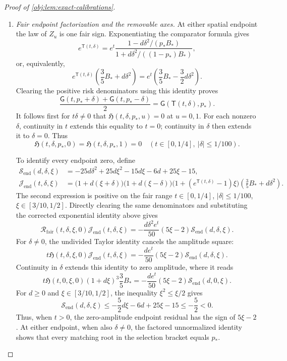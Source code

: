 \documentclass[11pt]{article}
\begin{document}
\begin{proof}[Proof of \cref{obj:lem:exact-calibrations}]
\begin{enumerate}
\item \emph{Fair endpoint factorization and the removable axes.}
At either spatial endpoint the law of \(Z_u\) is one fair sign. Exponentiating the comparator formula gives
\[
e^{\mathsf T(t,\delta)}
=e^t
\frac{1-d\delta^2/(p_*B_*)}
     {1+d\delta^2/((1-p_*)B_*)},
\]
or, equivalently,
\[
e^{\mathsf T(t,\delta)}
\left(\frac35B_*+d\delta^2\right)
=
e^t\left(\frac35B_*-\frac32d\delta^2\right).
\]
Clearing the positive risk denominators using this identity proves
\[
\frac{\mathsf G(t,p_*+\delta)+\mathsf G(t,p_*-\delta)}2
=\mathsf G(\mathsf T(t,\delta),p_*).
\]
It follows first for \(t\delta\ne0\) that
\(\mathfrak H(t,\delta,p_*,u)=0\) at \(u=0,1\).
For each nonzero \(\delta\), continuity in \(t\) extends this equality to \(t=0\); continuity in \(\delta\) then extends it to \(\delta=0\). Thus
\[
\mathfrak H(t,\delta,p_*,0)
=\mathfrak H(t,\delta,p_*,1)=0
\quad
\left(t\in[0,1/4],\ |\delta|\le1/100\right).
\]

To identify every endpoint zero, define
\[
\begin{aligned}
\mathcal S_{\mathrm{end}}(d,\delta,\xi)
&=-25d\delta^2+25d\xi^2-15d\xi-6d+25\xi-15,\\
\mathcal J_{\mathrm{end}}(t,\delta,\xi)
&=\bigl(1+d(\xi+\delta)\bigr)
  \bigl(1+d(\xi-\delta)\bigr)
  \bigl(1+(e^{\mathsf T(t,\delta)}-1)\xi\bigr)
  \left(\frac35B_*+d\delta^2\right).
\end{aligned}
\]
The second expression is positive on the fair range
\(t\in[0,1/4]\), \(|\delta|\le1/100\),
\(\xi\in[3/10,1/2]\). Directly clearing the same denominators and substituting the corrected exponential identity above gives
\[
\mathcal R_{\mathrm{fair}}(t,\delta,\xi,0)
\mathcal J_{\mathrm{end}}(t,\delta,\xi)
=
-\frac{d\delta^2e^t}{50}
(5\xi-2)\mathcal S_{\mathrm{end}}(d,\delta,\xi).
\]
For \(\delta\ne0\), the undivided Taylor identity cancels the amplitude square:
\[
t\mathfrak H(t,\delta,\xi,0)
\mathcal J_{\mathrm{end}}(t,\delta,\xi)
=
-\frac{de^t}{50}
(5\xi-2)\mathcal S_{\mathrm{end}}(d,\delta,\xi).
\]
Continuity in \(\delta\) extends this identity to zero amplitude, where it reads
\[
t\mathfrak H(t,0,\xi,0)(1+d\xi)^3\frac35B_*
=
-\frac{de^t}{50}
(5\xi-2)\mathcal S_{\mathrm{end}}(d,0,\xi).
\]
For \(d\ge0\) and \(\xi\in[3/10,1/2]\), the inequality
\(\xi^2\le\xi/2\) gives
\[
\mathcal S_{\mathrm{end}}(d,\delta,\xi)
\le-\frac52d\xi-6d+25\xi-15
\le-\frac52<0.
\]
Thus, when \(t>0\), the zero-amplitude endpoint residual has the sign of \(5\xi-2\). At either endpoint, when also \(\delta\ne0\), the factored unnormalized identity shows that every matching root in the selection bracket equals \(p_*\).


\end{enumerate}
\end{proof}
\end{document}
